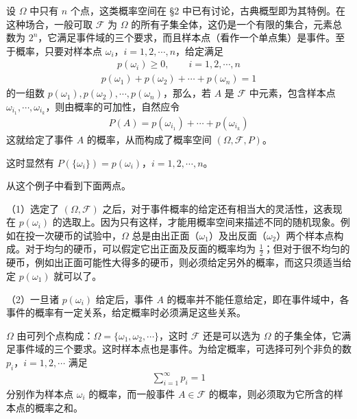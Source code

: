 \documentclass[../../main.tex]{subfiles}
\begin{document}
\begin{example}[有限概率空间]\label{example:ch01-有限概率空间}
设 $\Omega$ 中只有 $n$ 个点，这类概率空间在 \S 2 中已有讨论，古典概型即为其特例。在这种场合，一般可取 $\mathscr{F}$ 为 $\Omega$ 的所有子集全体，这仍是一个有限的集合，元素总数为 $2^n$，它满足事件域的三个要求，而且样本点（看作一个单点集）是事件。至于概率，只要对样本点 $\omega_i$，$i=1,2,\cdots,n$，给定满足
\begin{align*}
p(\omega_i)\geqslant 0,\qquad i=1,2,\cdots,n
\end{align*}
\begin{align*}
p(\omega_1)+p(\omega_2)+\cdots+p(\omega_n)=1
\end{align*}
的一组数 $p(\omega_1),p(\omega_2),\cdots,p(\omega_n)$，那么，若 $A$ 是 $\mathscr{F}$ 中元素，包含样本点 $\omega_{i_1},\cdots,\omega_{i_k}$，则由概率的可加性，自然应令
\begin{align*}
P(A)=p(\omega_{i_1})+\cdots+p(\omega_{i_k})
\end{align*}
这就给定了事件 $A$ 的概率，从而构成了概率空间 $(\Omega,\mathscr{F},P)$。

这时显然有 $P(\{\omega_i\})=p(\omega_i)$，$i=1,2,\cdots,n$。

从这个例子中看到下面两点。

（1）选定了 $(\Omega,\mathscr{F})$ 之后，对于事件概率的给定还有相当大的灵活性，这表现在 $p(\omega_i)$ 的选取上。因为只有这样，才能用概率空间来描述不同的随机现象。例如在投一次硬币的试验中，$\Omega$ 总是由出正面（$\omega_1$）及出反面（$\omega_2$）两个样本点构成。对于均匀的硬币，可以假定它出正面及反面的概率均为 $\frac{1}{2}$；但对于很不均匀的硬币，例如出正面可能性大得多的硬币，则必须给定另外的概率，而这只须适当给定 $p(\omega_1)$ 就可以了。

（2）一旦诸 $p(\omega_i)$ 给定后，事件 $A$ 的概率并不能任意给定，即在事件域中，各事件的概率有一定关系，给定概率时必须满足这些关系。
\end{example}

\begin{example}[离散概率空间]\label{example:ch01-离散概率空间}
$\Omega$ 由可列个点构成：$\Omega=\{\omega_1,\omega_2,\cdots\}$，这时 $\mathscr{F}$ 还是可以选为 $\Omega$ 的子集全体，它满足事件域的三个要求。这时样本点也是事件。为给定概率，可选择可列个非负的数 $p_i$，$i=1,2,\cdots$ 满足
\begin{align*}
\sum_{i=1}^{\infty}p_i=1
\end{align*}
分别作为样本点 $\omega_i$ 的概率，而一般事件 $A\in\mathscr{F}$ 的概率，则必须取为它所含的样本点的概率之和。
\end{example}
\end{document}
